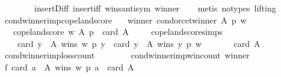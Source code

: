 \begin{isabellebody}
\ \ \ \ \ \ \ \ insert{\isacharunderscore}{\kern0pt}Diff\ insert{\isacharunderscore}{\kern0pt}iff\ wins{\isacharunderscore}{\kern0pt}antisym\ winner\isanewline
\ \ \isamarkupfalse%
\ {\isacharparenleft}{\kern0pt}metis\ {\isacharparenleft}{\kern0pt}no{\isacharunderscore}{\kern0pt}types{\isacharcomma}{\kern0pt}\ lifting{\isacharparenright}{\kern0pt}{\isacharparenright}{\kern0pt}%
\endisatagproof
{\isafoldproof}%
%
\isadelimproof
\isanewline
%
\endisadelimproof
\isanewline
\isanewline
{}\isamarkupfalse%
\ cond{\isacharunderscore}{\kern0pt}winner{\isacharunderscore}{\kern0pt}imp{\isacharunderscore}{\kern0pt}copeland{\isacharunderscore}{\kern0pt}score{\isacharcolon}{\kern0pt}\isanewline
\ \ \ winner{\isacharcolon}{\kern0pt}\ {\isachardoublequoteopen}condorcet{\isacharunderscore}{\kern0pt}winner\ A\ p\ w{\isachardoublequoteclose}\isanewline
\ \ \ {\isachardoublequoteopen}copeland{\isacharunderscore}{\kern0pt}score\ w\ A\ p\ {\isacharequal}{\kern0pt}\ card\ A\ {\isacharminus}{\kern0pt}{}{\isachardoublequoteclose}\isanewline
%
\isadelimproof
\ \ %
\endisadelimproof
%
\isatagproof
{}\isamarkupfalse%
\ copeland{\isacharunderscore}{\kern0pt}score{\isachardot}{\kern0pt}simps\isanewline
{}\isamarkupfalse%
\ {\isacharminus}{\kern0pt}\isanewline
\ \ \isamarkupfalse%
\isanewline
\ \ \ \ {\isachardoublequoteopen}card\ {\isacharbraceleft}{\kern0pt}y\ {\isasymin}\ A{\isachardot}{\kern0pt}\ wins\ w\ p\ y{\isacharbraceright}{\kern0pt}\ {\isacharminus}{\kern0pt}\ card\ {\isacharbraceleft}{\kern0pt}y\ {\isasymin}\ A{\isachardot}{\kern0pt}\ wins\ y\ p\ w{\isacharbraceright}{\kern0pt}\ {\isacharequal}{\kern0pt}\isanewline
\ \ \ \ \ \ card\ A\ {\isacharminus}{\kern0pt}\ {}{\isachardoublequoteclose}\isanewline
\ \ \ \ \isamarkupfalse%
\ cond{\isacharunderscore}{\kern0pt}winner{\isacharunderscore}{\kern0pt}imp{\isacharunderscore}{\kern0pt}loss{\isacharunderscore}{\kern0pt}count\isanewline
\ \ \ \ \ \ \ \ cond{\isacharunderscore}{\kern0pt}winner{\isacharunderscore}{\kern0pt}imp{\isacharunderscore}{\kern0pt}win{\isacharunderscore}{\kern0pt}count\ winner\isanewline
\ \ \isamarkupfalse%
\ {\isacharminus}{\kern0pt}\isanewline
\ \ \ \ \isamarkupfalse%
\ f{}{\isacharcolon}{\kern0pt}\ {\isachardoublequoteopen}card\ {\isacharbraceleft}{\kern0pt}a\ {\isasymin}\ A{\isachardot}{\kern0pt}\ wins\ w\ p\ a{\isacharbraceright}{\kern0pt}\ {\isacharequal}{\kern0pt}\ card\ A\ {\isacharminus}{\kern0pt}\ {}{\isachardoublequoteclose}\isanewline

\end{isabellebody}
